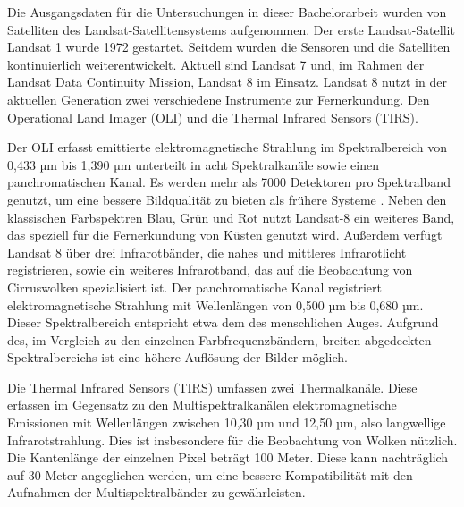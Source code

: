 Die Ausgangsdaten für die Untersuchungen in dieser Bachelorarbeit wurden von Satelliten des Landsat-Satellitensystems aufgenommen. Der erste Landsat-Satellit Landsat 1 wurde 1972 gestartet. Seitdem wurden die Sensoren und die Satelliten kontinuierlich weiterentwickelt. Aktuell sind Landsat 7 und, im Rahmen der Landsat Data Continuity Mission, Landsat 8 im Einsatz. Landsat 8 nutzt in der aktuellen Generation zwei verschiedene Instrumente zur Fernerkundung. Den Operational Land Imager (OLI) und die Thermal Infrared Sensors (TIRS). 

Der OLI erfasst emittierte elektromagnetische Strahlung im Spektralbereich von 0,433 µm bis 1,390 µm unterteilt in acht Spektralkanäle sowie einen panchromatischen Kanal. Es werden mehr als 7000 Detektoren pro Spektralband genutzt, um eine bessere Bildqualität zu bieten als frühere Systeme \cite{Markham2004}. Neben den klassischen Farbspektren Blau, Grün und Rot nutzt Landsat-8 ein weiteres Band, das speziell für die Fernerkundung von Küsten genutzt wird. Außerdem verfügt Landsat 8 über drei Infrarotbänder, die nahes und mittleres Infrarotlicht registrieren, sowie ein weiteres Infrarotband, das auf die Beobachtung von Cirruswolken spezialisiert ist. Der panchromatische Kanal registriert elektromagnetische Strahlung mit Wellenlängen von 0,500 µm bis 0,680 µm. Dieser Spektralbereich entspricht etwa dem des menschlichen Auges. Aufgrund des, im Vergleich zu den einzelnen Farbfrequenzbändern, breiten abgedeckten Spektralbereichs ist eine höhere Auflösung der Bilder möglich.

Die Thermal Infrared Sensors (TIRS) \cite{Chaudhary2011} umfassen zwei Thermalkanäle. Diese erfassen im Gegensatz zu den Multispektralkanälen elektromagnetische Emissionen mit Wellenlängen zwischen 10,30 µm und 12,50 µm, also langwellige Infrarotstrahlung. Dies ist insbesondere für die Beobachtung von Wolken nützlich. Die Kantenlänge der einzelnen Pixel beträgt 100 Meter. Diese kann nachträglich auf 30 Meter angeglichen werden, um eine bessere Kompatibilität mit den Aufnahmen der Multispektralbänder zu gewährleisten.

